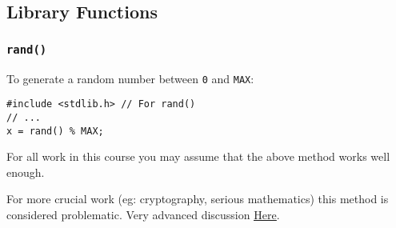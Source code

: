 \documentclass{lab}
\begin{document}
\begin{multicols}{2}
\subsection{Library Functions}
\subsubsection{\texttt{rand()}}

To generate a random number between \texttt{0} and \texttt{MAX}:

\begin{lstlisting}[style=CStyle]
#include <stdlib.h> // For rand()
// ...
x = rand() % MAX;
\end{lstlisting}

For all work in this course you may assume that the above method works well enough.

For more crucial work (eg: cryptography, serious mathematics) this method is considered problematic. Very advanced discussion \underline{\href{http://www.azillionmonkeys.com/qed/random.html}{Here}}.

\begin{lstlisting}[style=CStyle]
\end{lstlisting}


\begin{lstlisting}[style=CStyle]
\end{lstlisting}

\end{multicols}
\end{document}

